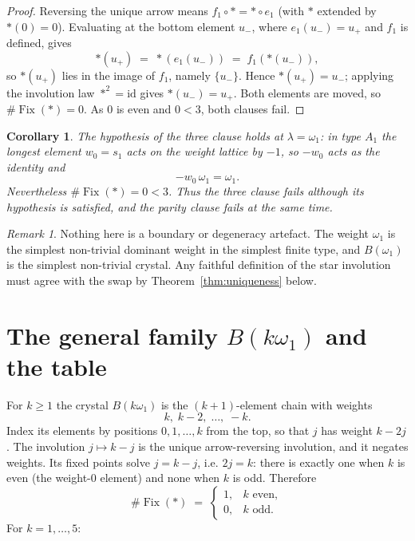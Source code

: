 \documentclass[11pt]{article}
\newtheorem{corollary}[theorem]{Corollary}
\theoremstyle{definition}
\theoremstyle{remark}
\newtheorem{remark}[theorem]{Remark}
\newcommand{\Fix}{\operatorname{Fix}}
\begin{document}
\begin{proof}
Reversing the unique arrow means $f_1 \circ * = * \circ e_1$ (with $*$ extended
by $*(0) = 0$). Evaluating at the bottom element $u_-$, where $e_1(u_-) = u_+$
and $f_1$ is defined, gives
\[
*(u_+) \;=\; *(e_1(u_-)) \;=\; f_1(*(u_-)) ,
\]
so $*(u_+)$ lies in the image of $f_1$, namely $\{u_-\}$. Hence $*(u_+) = u_-$;
applying the involution law $*^2 = \mathrm{id}$ gives $*(u_-) = u_+$. Both
elements are moved, so $\#\Fix(*) = 0$. As $0$ is even and $0 < 3$, both clauses
fail.
\end{proof}

\begin{corollary}
The hypothesis of the three clause holds at $\lambda = \omega_1$: in type $A_1$
the longest element $w_0 = s_1$ acts on the weight lattice by $-1$, so $-w_0$
acts as the identity and
\[
-w_0\,\omega_1 = \omega_1 .
\]
Nevertheless $\#\Fix(*) = 0 < 3$. Thus the three clause fails although its
hypothesis is satisfied, and the parity clause fails at the same time.
\end{corollary}

\begin{remark}
Nothing here is a boundary or degeneracy artefact. The weight $\omega_1$ is the
simplest non-trivial dominant weight in the simplest finite type, and
$B(\omega_1)$ is the simplest non-trivial crystal. Any faithful definition of
the star involution must agree with the swap by
Theorem~\ref{thm:uniqueness} below.
\end{remark}

\section{The general family $B(k\omega_1)$ and the table}

For $k \ge 1$ the crystal $B(k\omega_1)$ is the $(k+1)$-element chain with
weights
\[
k,\; k-2,\; \dots,\; -k .
\]
Index its elements by positions $0, 1, \dots, k$ from the top, so that $j$ has
weight $k - 2j$. The involution $j \mapsto k - j$ is the unique arrow-reversing
involution, and it negates weights. Its fixed points solve $j = k - j$, i.e.
$2j = k$: there is exactly one when $k$ is even (the weight-$0$ element) and
none when $k$ is odd. Therefore
\begin{equation}\label{eq:closed}
\#\Fix(*) \;=\;
\begin{cases}
1, & k \text{ even},\\[2pt]
0, & k \text{ odd}.
\end{cases}
\end{equation}
For $k = 1, \dots, 5$:
\end{document}
